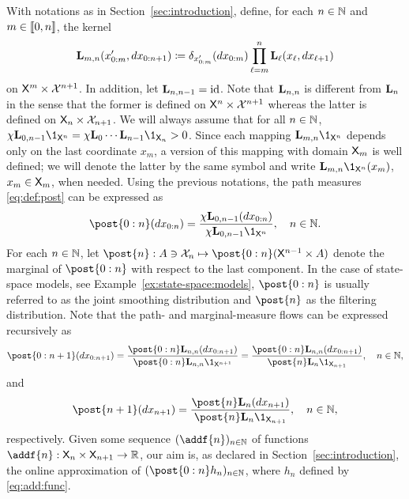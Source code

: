 With notations as in Section~\ref{sec:introduction}, define, for each $n \in \mathbb{N}$ and $m \in \llbracket 0, n \rrbracket$, the kernel 
\begin{equation} \label{eq:def:uk:products}
    \uk{m, n}(x_{0:m}', \rmd x_{0:n + 1}) \eqdef \delta_{x_{0:m}'}(\rmd x_{0:m}) \prod_{\ell = m}^n \uk{\ell}(x_\ell, \rmd x_{\ell + 1}) 
\end{equation}
on $\mathsf{X}^m \times \mathcal{X}^{n + 1}$. In addition, let $\mathbf{L}_{n, n - 1} = \operatorname{id}$. Note that $\mathbf{L}_{n, n}$ is different from $\mathbf{L}_{n}$ in the sense that the former is defined on $\mathsf{X}^n \times \mathcal{X}^{n + 1}$ whereas the latter is defined on $\mathsf{X}_n \times \mathcal{X}_{n + 1}$. We will always assume that for all $n \in \mathbb{N}$, $\chi \uk{0, n - 1} \1_{\Xset^n} = \chi \uk{0} \cdots \uk{n - 1} \1_{\Xset_n} > 0$. Since each mapping $\uk{m, n} \1_{\Xset^n}$ depends only on the last coordinate $x_m$, a version of this mapping with domain $\mathsf{X}_m$ is well defined; we will denote the latter by the same symbol and write $\uk{m, n} \1_{\Xset^n}(x_m)$, $x_m \in \mathsf{X}_m$, when needed. Using the previous notations, the path measures \eqref{eq:def:post} can be expressed as 
\begin{equation}
\label{eq:FK:path}
    \post{0:n}(\rmd x_{0:n}) = \frac{\chi \uk{0, n - 1}(\rmd x_{0:n})}{\chi \uk{0, n - 1} \1_{\Xset^n}}, \quad n \in \nset. 
\end{equation} 
For each $n \in \mathbb{N}$, let  
$ 
\post{n} : A \ni \Xfd_n \mapsto \post{0:n}(\Xset^{n - 1} \times A)
$
denote the marginal of $\post{0:n}$ with respect to the last component. In the case of state-space models, see Example~\ref{ex:state-space:models}, $\post{0:n}$ is usually referred to as the joint smoothing distribution and $\post{n}$ as the filtering distribution. Note that the path- and marginal-measure flows can be expressed recursively as  
\begin{equation} \label{eq:recursion:FK:path}
    \post{0:n + 1}(\rmd x_{0:n + 1}) = \frac{\post{0:n} \uk{n, n}(\rmd x_{0:n + 1})}{\post{0:n} \uk{n, n} \1_{\Xset^{n + 1}}} = \frac{\post{0:n} \uk{n, n}(\rmd x_{0:n + 1})}{\post{n} \uk{n} \1_{\Xset_{n + 1}}}, \quad n \in \nset, 
\end{equation}
and 
\begin{equation} \label{eq:recursion:FK:marg}
    \post{n + 1}(\rmd x_{n + 1}) = \frac{\post{n} \uk{n}(\rmd x_{n + 1})}{\post{n} \uk{n} \1_{\Xset_{n + 1}}}, \quad n \in \nset, 
\end{equation}
respectively. Given some sequence $(\addf{n})_{n \in \nset}$ of functions $\addf{n} : \Xset_n \times \Xset_{n + 1} \to \rset$, our aim is, as declared in Section~\ref{sec:introduction}, the online approximation of $(\post{0:n} h_n)_{n \in \nset}$, where $h_n$ defined by \eqref{eq:add:func}. 

